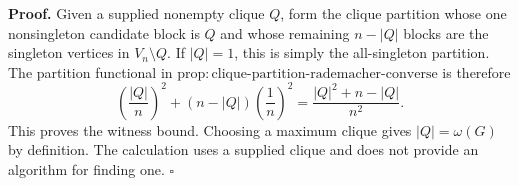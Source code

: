 \textbf{Proof.}
Given a supplied nonempty clique \(Q\), form the clique partition whose one nonsingleton candidate block is \(Q\) and whose remaining \(n-|Q|\) blocks are the singleton vertices in \(V_n\setminus Q\).  If \(|Q|=1\), this is simply the all-singleton partition.  The partition functional in \(\mathrm{prop{:}clique\text{-}partition\text{-}rademacher\text{-}converse}\) is therefore
\[
\left(\frac{|Q|}{n}\right)^2
+(n-|Q|)\left(\frac1n\right)^2
=\frac{|Q|^2+n-|Q|}{n^2}.
\]
This proves the witness bound.  Choosing a maximum clique gives \(|Q|=\omega(G)\) by definition.  The calculation uses a supplied clique and does not provide an algorithm for finding one. \(\square\)